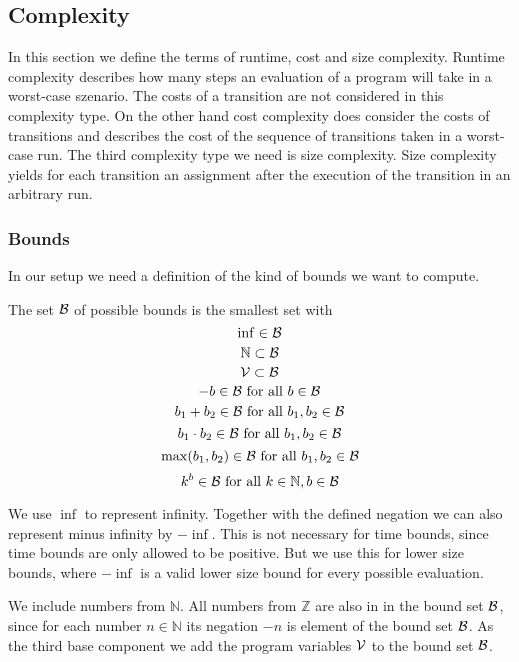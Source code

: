 \subsection{Complexity}

In this section we define the terms of runtime, cost and size complexity.
Runtime complexity describes how many steps an evaluation of a program will take in a worst-case szenario.
The costs of a transition are not considered in this complexity type.
On the other hand cost complexity does consider the costs of transitions and describes the cost of the sequence of transitions taken in a worst-case run.
The third complexity type we need is size complexity.
Size complexity yields for each transition an assignment  after the execution of the transition in an arbitrary run.

\subsubsection{Bounds}

In our setup we need a definition of the kind of bounds we want to compute.

\begin{definition}
  The set $\mathcal{B}$ of possible bounds is the smallest set with
  \[ \inf \in \mathcal{B} \]
  \[ \mathbb{N} \subset \mathcal{B} \] 
  \[ \mathcal{V} \subset \mathcal{B} \] 
  \[ -b \in \mathcal{B} \text{ for all } b \in \mathcal{B} \] 
  \[ b_1 + b_2 \in \mathcal{B} \text{ for all } b_1, b_2 \in \mathcal{B} \] 
  \[ b_1 \cdot b_2 \in \mathcal{B} \text{ for all } b_1, b_2 \in \mathcal{B} \] 
  \[ \max(b_1, b_2) \in \mathcal{B} \text{ for all } b_1, b_2 \in \mathcal{B} \]
  \[ k^b \in \mathcal{B} \text{ for all } k \in \mathbb{N}, b \in \mathcal{B} \]
\end{definition}

We use $\inf$ to represent infinity.
Together with the defined negation we can also represent minus infinity by $-\inf$.
This is not necessary for time bounds, since time bounds are only allowed to be positive.
But we use this for lower size bounds, where $-\inf$ is a valid lower size bound for every possible evaluation.

We include numbers from $\mathbb{N}$.
All numbers from $\mathbb{Z}$ are also in in the bound set $\mathcal{B}$, since for each number $n \in \mathbb{N}$ its negation $-n$ is element of the bound set $\mathcal{B}$.
As the third base component we add the program variables $\mathcal{V}$ to the bound set $\mathcal{B}$.

